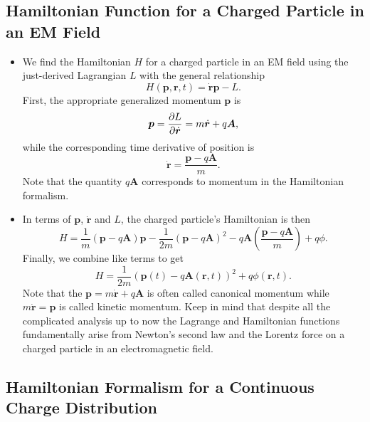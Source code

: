 \documentclass[11pt, a4paper]{article}
\renewcommand{\vec}[1]{\bm{#1}} %
\renewcommand{\r}{\vec{r}}
\newcommand{\A}{\vec{A}} %
\begin{document}
\subsection{Hamiltonian Function for a Charged Particle in an EM Field}
\begin{itemize}
    \item We find the Hamiltonian $ H $ for a charged particle in an EM field using the just-derived Lagrangian $ L $ with the general relationship
    \begin{equation*}
        H( \vec{p}, \vec{r}, t) = \dot{\vec{r}} \vec{p} - L.
    \end{equation*}
    First, the appropriate generalized momentum $ \vec{p} $ is
    \begin{equation*}
        \vec{p} = \pdv{L}{ \dot{\vec{r}}} = m \dot{\vec{r}} + q \A,
    \end{equation*}
    while the corresponding time derivative of position is
    \begin{equation*}
        \dot{\vec{r}} = \frac{\vec{p} - q\A}{m}.
    \end{equation*}
    Note that the quantity $ q \A $ corresponds to momentum in the Hamiltonian formalism. 

    \item In terms of $ \vec{p} $, $ \dot{\vec{r}} $ and $ L $, the charged particle's Hamiltonian is then
    \begin{equation*}
        H = \frac{1}{m} ( \vec{p} - q\A) \vec{p} - \frac{1}{2m} ( \vec{p} - q\A)^{2} - q\A \left( \frac{ \vec{p} - q \A}{m} \right) + q \phi.
    \end{equation*}
    Finally, we combine like terms to get
    \begin{equation*}
        H = \frac{1}{2m}( \vec{p}(t) - q\A (\r, t))^{2} + q \phi(\r, t).
    \end{equation*}
    Note that the $ \vec{p} = m \dot{\vec{r}} + q \A $ is often called canonical momentum while $ m \dot{\vec{r}} = \vec{p} $ is called kinetic momentum. Keep in mind that despite all the complicated analysis up to now the Lagrange and Hamiltonian functions fundamentally arise from Newton's second law and the Lorentz force on a charged particle in an electromagnetic field.
    
\end{itemize}


\subsection{Hamiltonian Formalism for a Continuous Charge Distribution}
\end{document}

